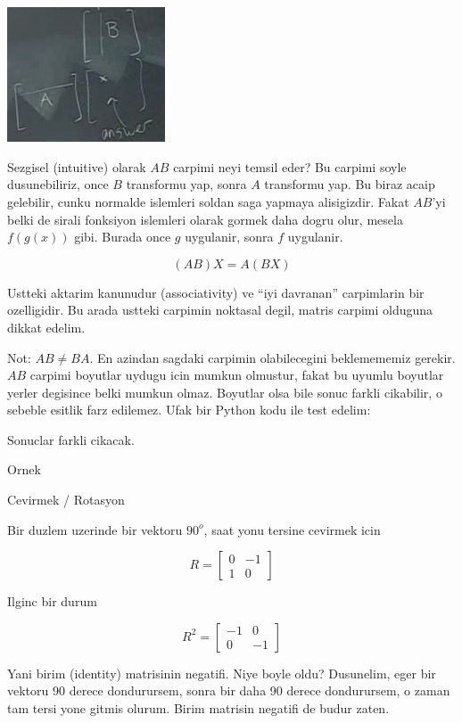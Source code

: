 \documentclass[12pt,fleqn]{article}\usepackage{../common}
\begin{document}
\includegraphics[height=4cm]{3_4.png}

Sezgisel (intuitive) olarak $AB$ carpimi neyi temsil eder? Bu carpimi soyle
dusunebiliriz, once $B$ transformu yap, sonra $A$ transformu yap. Bu biraz
acaip gelebilir, cunku normalde islemleri soldan saga yapmaya
alisigizdir. Fakat $AB$'yi belki de sirali fonksiyon islemleri olarak
gormek daha dogru olur, mesela $f(g(x))$ gibi. Burada once $g$ uygulanir,
sonra $f$ uygulanir. 

\[ (AB)X = A(BX) \]

Ustteki aktarim kanunudur (associativity) ve ``iyi davranan'' carpimlarin
bir ozelligidir. Bu arada ustteki carpimin noktasal degil, matris carpimi
olduguna dikkat edelim. 

Not: $AB \ne BA$. En azindan sagdaki carpimin olabilecegini beklemememiz
gerekir. $AB$ carpimi boyutlar uydugu icin mumkun olmustur, fakat bu uyumlu
boyutlar yerler degisince belki mumkun olmaz. Boyutlar olsa bile sonuc
farkli cikabilir, o sebeble esitlik farz edilemez. Ufak bir Python kodu ile
test edelim:



Sonuclar farkli cikacak. 

Ornek

Cevirmek / Rotasyon

Bir duzlem uzerinde bir vektoru $90^o$, saat yonu tersine cevirmek icin 

\[ R =
\left[\begin{array}{rr}
0 & -1 \\
1 & 0
\end{array}\right]
 \]

Ilginc bir durum

\[ R^2 =
\left[\begin{array}{rr}
-1 & 0 \\
0 & -1
\end{array}\right]
 \]

Yani birim (identity) matrisinin negatifi. Niye boyle oldu? Dusunelim, eger
bir vektoru 90 derece dondurursem, sonra bir daha 90 derece dondurursem, o
zaman tam tersi yone gitmis olurum. Birim matrisin negatifi de budur
zaten. 
\end{document}
